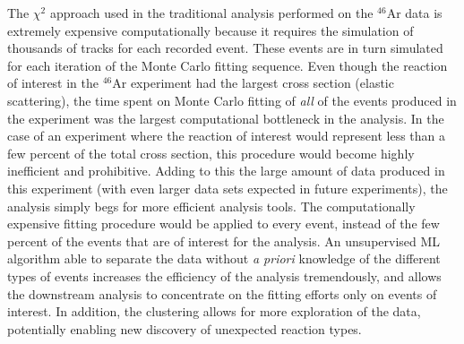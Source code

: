 \documentclass[preprint,12pt]{elsarticle}
\begin{document}
The $\chi^2$ approach used in the traditional analysis performed on the $^{46}$Ar data is extremely expensive computationally because it requires the simulation of thousands of tracks for each recorded event. These events are in turn simulated for each iteration of the Monte Carlo fitting sequence. Even though the reaction of interest in the $^{46}$Ar experiment had the largest cross section (elastic scattering), the time spent on Monte Carlo fitting of {\em all} of the events produced in the experiment was the largest computational bottleneck in the analysis. In the case of an experiment where the reaction of interest would represent less than a few percent of the total cross section, this procedure would become highly inefficient and prohibitive. Adding to this the large amount of data produced in this experiment (with even larger data sets expected in future experiments), the analysis simply begs for more efficient analysis tools. 
The computationally expensive fitting procedure would be applied to every event, instead of the few percent of the events that are of interest for the analysis.
An unsupervised ML algorithm able to separate the data without {\em a priori} knowledge of the different types of events increases the efficiency of the analysis tremendously, and allows the downstream analysis to concentrate on the fitting efforts only on events of interest. In addition, the clustering allows for more exploration of the data, potentially enabling new discovery of unexpected reaction types.




\end{document}
